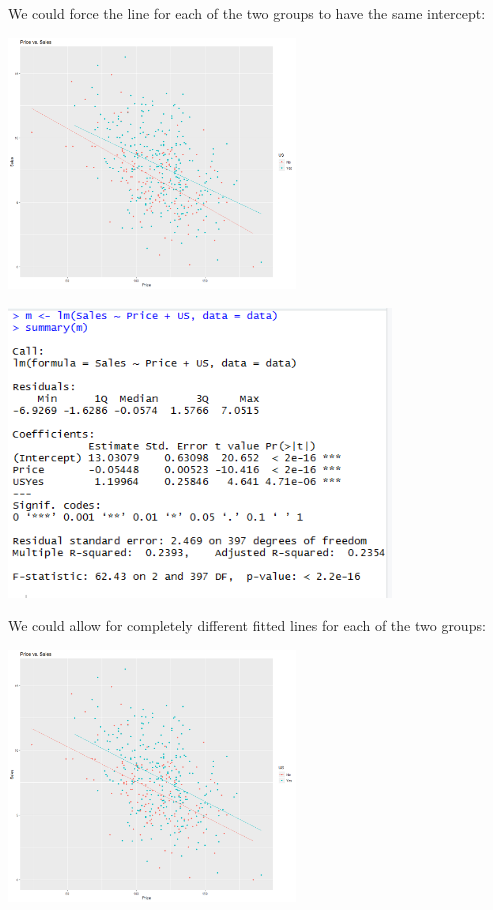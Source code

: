 \begin{frame}
\bi
	\item We could force the line for each of the two groups to have the same intercept:
\ei
\begin{center}
	\includegraphics[width = 3in]{SalesPriceUSsameintercept.png}
\end{center}
\end{frame}

\begin{frame}
\begin{center}
	\includegraphics[width = 4in]{SalesPriceFullLMoutput.png}
\end{center}
\end{frame}

\begin{frame}
\bi
	\item We could allow for completely different fitted lines for each of the two groups:
\ei
\begin{center}
	\includegraphics[width = 3in]{SalesPriceUSfull.png}
\end{center}
\end{frame}

